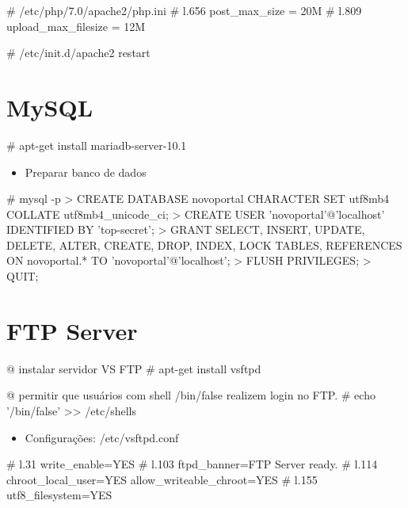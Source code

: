 \begin{BoxVerbatim}
# /etc/php/7.0/apache2/php.ini
# l.656
post_max_size = 20M
# l.809
upload_max_filesize = 12M
\end{BoxVerbatim}

\begin{BoxVerbatim}
# /etc/init.d/apache2 restart
\end{BoxVerbatim}

\section{MySQL}\setcounter{SteP}{1}

\begin{BoxVerbatim}
# apt-get install mariadb-server-10.1
\end{BoxVerbatim}

\begin{itemize}
\item{\bf }Preparar banco de dados
\end{itemize}

\begin{BoxVerbatim}
# mysql -p
> CREATE DATABASE novoportal CHARACTER SET utf8mb4 COLLATE utf8mb4_unicode_ci;
> CREATE USER 'novoportal'@'localhost' IDENTIFIED BY 'top-secret';
> GRANT SELECT, INSERT, UPDATE, DELETE, ALTER, CREATE, DROP, INDEX, LOCK TABLES, REFERENCES ON novoportal.* TO 'novoportal'@'localhost';
> FLUSH PRIVILEGES;
> QUIT;
\end{BoxVerbatim}

\section{FTP Server}\setcounter{SteP}{1}

\begin{BoxVerbatim}
@ instalar servidor VS FTP
# apt-get install vsftpd

@ permitir que usuários com shell /bin/false realizem login no FTP.
# echo '/bin/false' >> /etc/shells
\end{BoxVerbatim}

\begin{itemize}
\item{\bf }Configurações: /etc/vsftpd.conf
\end{itemize}

\begin{BoxVerbatim}
# l.31
write_enable=YES
# l.103
ftpd_banner=FTP Server ready.
# l.114
chroot_local_user=YES
allow_writeable_chroot=YES
# l.155
utf8_filesystem=YES
\end{BoxVerbatim}

